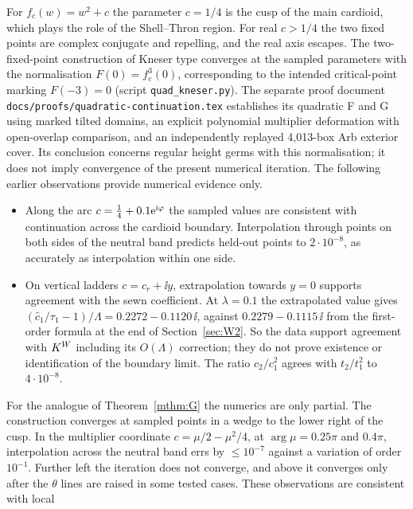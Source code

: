 \begin{remark}\label{rem:gen-quad}
For $f_c(w)=w^2+c$ the parameter $c=1/4$ is the cusp of the main cardioid, which
plays the role of the Shell--Thron region.  For real $c>1/4$ the two fixed points
are complex conjugate and repelling, and the real axis escapes.  The
two-fixed-point construction of Kneser type converges at the sampled
parameters with the normalisation $F(0)=f_c^3(0)$, corresponding to the intended
critical-point marking $F(-3)=0$ (script \texttt{quad\_kneser.py}).
The separate proof document \texttt{docs/proofs/quadratic-continuation.tex}
establishes its quadratic F and G using marked tilted domains, an explicit
polynomial multiplier deformation with open-overlap comparison, and an
independently replayed 4,013-box Arb exterior cover. Its conclusion concerns
regular height germs with this normalisation; it does not imply convergence
of the present numerical iteration. The following earlier observations
provide numerical evidence only.
\begin{itemize}
\item Along the arc $c=\tfrac14+0.1\mathrm{e}^{\mathrm{i}\varphi}$ the sampled values are
  consistent with continuation across the cardioid boundary.  Interpolation
  through points on both sides of the
  neutral band predicts held-out points to $2\cdot10^{-8}$, as accurately as
  interpolation within one side.
\item On vertical ladders $c=c_r+\ii y$, extrapolation towards $y=0$ supports
  agreement with the sewn coefficient.  At $\lambda=0.1$ the extrapolated value gives
  $(\hat c_1/\tau_1-1)/\Lambda=0.2272-0.1120\,\ii$, against $0.2279-0.1115\,\ii$
  from the first-order formula at the end of Section~\ref{sec:W2}.  So the
  data support agreement with $K^W$ including its $O(\Lambda)$ correction;
  they do not prove existence or identification of the boundary limit.  The ratio
  $c_2/c_1^2$ agrees with $t_2/t_1^2$ to $4\cdot10^{-8}$.
\end{itemize}
For the analogue of Theorem~\ref{mthm:G} the numerics are only partial.  The
construction converges at sampled points in a wedge to the lower right of the
cusp.  In the multiplier coordinate $c=\mu/2-\mu^2/4$, at
$\arg\mu=0.25\pi$ and $0.4\pi$, interpolation across the neutral band errs by
$\le10^{-7}$ against a variation of order $10^{-1}$.  Further left the iteration
does not converge, and above it converges only after the $\theta$ lines are
raised in some tested cases.  These observations are consistent with local

\end{remark}
